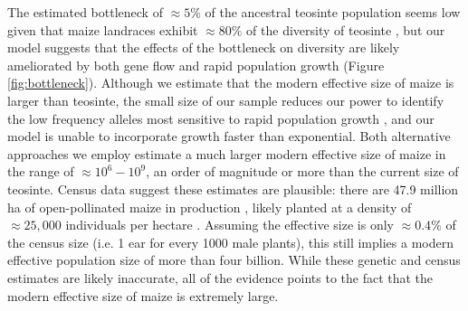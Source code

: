 \documentclass[12pt,a4paper]{article}
\begin{document}
The estimated bottleneck of $\approx 5\%$ of the ancestral teosinte population seems low given that maize landraces exhibit $\approx 80\%$ of the diversity of teosinte \cite{hufford2012}, but our model suggests that the effects of the bottleneck on diversity are likely ameliorated by both gene flow and rapid population growth (Figure \ref{fig:bottleneck}).   
Although we estimate that the modern effective size of maize is larger than teosinte, the small size of our sample reduces our power to identify the low frequency alleles most sensitive to rapid population growth \cite{keinan2012}, and our model is unable to incorporate growth faster than exponential.  
Both alternative approaches we employ estimate a much larger modern effective size of maize in the range of $\approx 10^6 - 10^9$, an order of magnitude or more than the current size of teosinte.
Census data suggest these estimates are plausible: there are 47.9 million ha of open-pollinated maize in production \cite{cimmyt1999}, likely planted at a density of $\approx 25,000$ individuals per hectare \cite{baden2001}.
Assuming the effective size is only $\approx 0.4\%$ of the census size (i.e. 1 ear for every 1000 male plants), this still implies a modern effective population size of more than four billion.
While these genetic and census estimates are likely inaccurate, all of the evidence points to the fact that the modern effective size of maize is extremely large.
\end{document}
